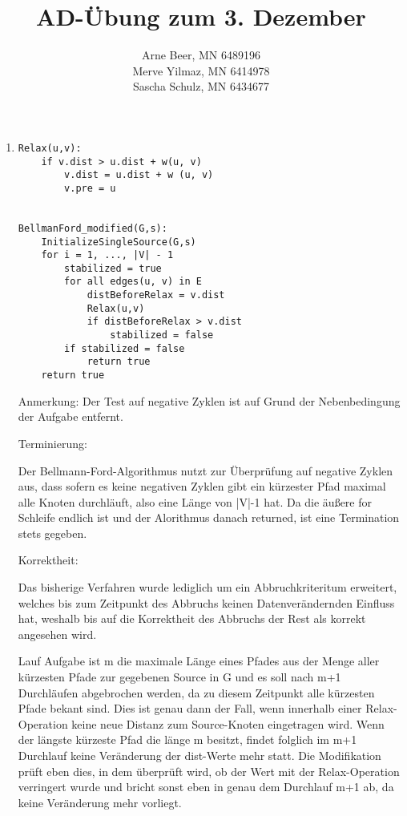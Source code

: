 \documentclass{article}
\title{AD-Übung zum 3. Dezember}
\author{Arne Beer, MN 6489196\\
Merve Yilmaz, MN 6414978\\
Sascha Schulz, MN 6434677}
\begin{document}
\maketitle

\begin{enumerate}[\bfseries1.]
\item 

\begin{verbatim}
Relax(u,v):
    if v.dist > u.dist + w(u, v)
        v.dist = u.dist + w (u, v)
        v.pre = u


BellmanFord_modified(G,s):
    InitializeSingleSource(G,s)
    for i = 1, ..., |V| - 1
        stabilized = true
        for all edges(u, v) in E
            distBeforeRelax = v.dist
            Relax(u,v)
            if distBeforeRelax > v.dist
                stabilized = false
        if stabilized = false
            return true
    return true
\end{verbatim}

Anmerkung: Der Test auf negative
Zyklen ist auf Grund der Nebenbedingung der Aufgabe entfernt.

Terminierung: 

Der Bellmann-Ford-Algorithmus nutzt zur Überprüfung auf negative
Zyklen aus, dass sofern es keine negativen Zyklen gibt ein kürzester Pfad
maximal alle Knoten durchläuft, also eine Länge von |V|-1 hat. Da die äußere for
Schleife endlich ist und der Alorithmus danach returned, ist eine Termination
stets gegeben.

Korrektheit:

Das bisherige Verfahren wurde lediglich um ein Abbruchkriteritum erweitert,
welches bis zum Zeitpunkt des Abbruchs keinen Datenverändernden Einfluss hat, 
weshalb bis auf die Korrektheit des Abbruchs der Rest als korrekt
angesehen wird.

Lauf Aufgabe ist m die maximale Länge eines Pfades aus der Menge aller kürzesten
Pfade zur gegebenen Source in G und es soll nach m+1 Durchläufen abgebrochen
werden, da zu diesem Zeitpunkt alle kürzesten Pfade bekant sind. Dies ist genau dann der Fall, wenn
innerhalb einer Relax-Operation keine neue Distanz zum Source-Knoten eingetragen
wird. Wenn der längste kürzeste Pfad die länge m besitzt, findet folglich im
m+1 Durchlauf keine Veränderung der dist-Werte mehr statt. Die Modifikation
prüft eben dies, in dem überprüft wird, ob der Wert mit der Relax-Operation
verringert wurde und bricht sonst eben in genau dem Durchlauf m+1 ab, da keine
Veränderung mehr vorliegt.



\end{enumerate}
\end{document}

